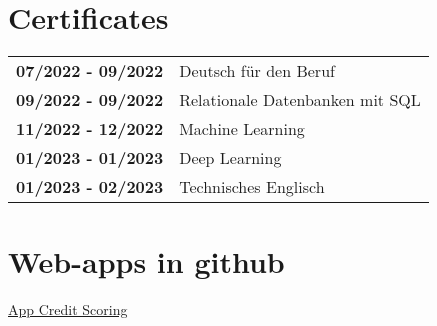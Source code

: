 \documentclass[grey]{hipstercv}
\begin{document}
\begin{paracol}{2}
\begin{minipage}[t]{0.16\textwidth}
 \hspace{1em}
\end{minipage}

\vspace{4em}

\begin{minipage}[t]{0.3\textwidth}
\section*{Certificates}
\begin{tabular}{>{\footnotesize\bfseries}r >{\footnotesize}p{}}
	07/2022 - 09/2022 & Deutsch für den Beruf \\
	09/2022 - 09/2022 & Relationale Datenbanken mit SQL\\
    11/2022 - 12/2022 & Machine Learning \\
    01/2023 - 01/2023 & Deep Learning \\
    01/2023 - 02/2023 & Technisches Englisch 
\end{tabular}
\vspace{4em}
\section*{ Web-apps in github }

\href{https://github.com/AlexanderUhmann/streamlit_cs}{App Credit Scoring}


\end{minipage}
\end{paracol}
\end{document}
